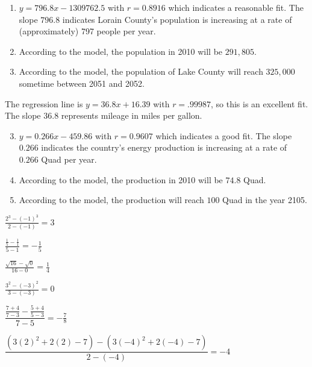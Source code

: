 \begin{exenum}
\begin{enumerate}
\end{enumerate}

\item  \begin{enumerate}

\item  $y = 796.8x - 1309762.5$ with $r=0.8916$ which indicates a reasonable fit.  The slope $796.8$ indicates Lorain County's population is increasing at a rate of (approximately) 797 people per year.

\item  According to the model, the population in 2010 will be $291, \! 805$.

\item  According to the model, the population of Lake County will reach $325,\!000$ sometime between 2051 and 2052.

\end{enumerate}

\item The regression line is $y = 36.8x + 16.39$ with  $r = .99987$, so this is an excellent fit.  The slope $36.8$ represents mileage in miles per gallon.

\item \begin{enumerate}

\setcounter{enumii}{2}

\item $y = 0.266x - 459.86$ with $r = 0.9607$ which indicates a good fit.  The slope $0.266$ indicates the country's energy production is increasing at a rate of $0.266$ Quad per year.

\item According to the model, the production in 2010 will be $74.8$ Quad.

\item According to the model, the production will reach $100$ Quad in the year 2105.

\end{enumerate}

\end{exenum}

\begin{shortexenum}
\item $\frac{2^{3} - (-1)^{3}}{2 - (-1)} = 3$
\item $\frac{\frac{1}{5} - \frac{1}{1}}{5 - 1} = -\frac{1}{5}$
\item $\frac{\sqrt{16} - \sqrt{0}}{16 - 0} = \frac{1}{4}$
\item $\frac{3^{2} - (-3)^{2}}{3 - (-3)} = 0$
\item $\dfrac{\frac{7 + 4}{7 - 3} - \frac{5 + 4}{5 - 3}}{7 - 5} = -\frac{7}{8}$
\item \scriptsize $\dfrac{(3(2)^{2}+2(2)-7)-(3(-4)^{2}+2(-4)-7)}{2-(-4)}=-4$ \normalsize
\end{shortexenum}


